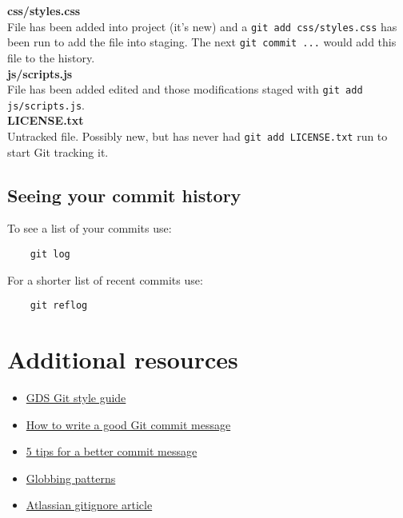 \textbf{css/styles.css}
\\
File has been added into project (it's new) and a \texttt{git add css/styles.css} has been run to add the file into staging. The next \texttt{git commit ...} would add this file to the history.
\\

\textbf{js/scripts.js}
\\
File has been added edited and those modifications staged with \texttt{git add js/scripts.js}.
\\

\textbf{LICENSE.txt}
\\
Untracked file. Possibly new, but has never had \texttt{git add LICENSE.txt} run to start Git tracking it.
\\

\subsection{Seeing your commit history}

To see a list of your commits use:

\begin{verbatim}
    git log
\end{verbatim}

For a shorter list of recent commits use:

\begin{verbatim}
    git reflog
\end{verbatim}


\section{Additional resources}

\begin{itemize}[leftmargin=*]
    \item \href{https://github.com/alphagov/styleguides/blob/master/git.md}{GDS Git style guide}
    \item \href{https://chris.beams.io/posts/git-commit/}{How to write a good Git commit message}
	\item \href{https://thoughtbot.com/blog/5-useful-tips-for-a-better-commit-message}{5 tips for a better commit message}
	\item \href{https://linux.die.net/man/7/glob}{Globbing patterns}
	\item \href{https://www.atlassian.com/git/tutorials/saving-changes/gitignore}{Atlassian gitignore article}
\end{itemize}

